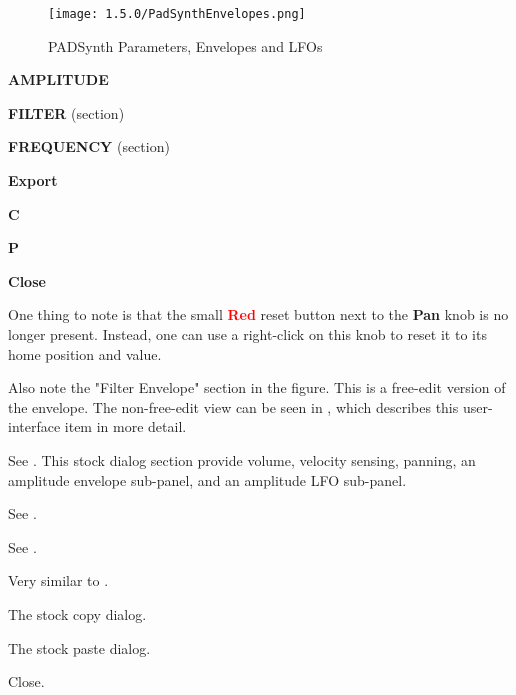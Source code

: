 \begin{figure}[H]
   \centering 
   \texttt{[image: 1.5.0/PadSynthEnvelopes.png]}
   \caption{PADSynth Parameters, Envelopes and LFOs}
   \label{fig:padsynth_parameters_envelopes_and_lfos}
\end{figure}

   \begin{enumber}
      \item \textbf{AMPLITUDE}
      \item \textbf{FILTER} (section)
      \item \textbf{FREQUENCY} (section)
      \item \textbf{Export}
      \item \textbf{C}
      \item \textbf{P}
      \item \textbf{Close}
   \end{enumber}

   One thing to note is that the small \textbf{\textcolor{red}{Red}}
   reset button next to the \textbf{Pan} knob is no longer present.  Instead,
   one can use a right-click on this knob to reset it to its home position and
   value.

   Also note the "Filter Envelope" section in the figure.  This is a free-edit
   version of the envelope.  The non-free-edit view can be seen in
   , which describes this user-interface item in more
   detail.  

   See .
   This stock dialog section provide volume, velocity sensing, panning, an
   amplitude envelope sub-panel, and an amplitude LFO sub-panel.

   See .

   See .

   Very similar to 
   .

   The stock copy dialog.

   The stock paste dialog.

   Close.

